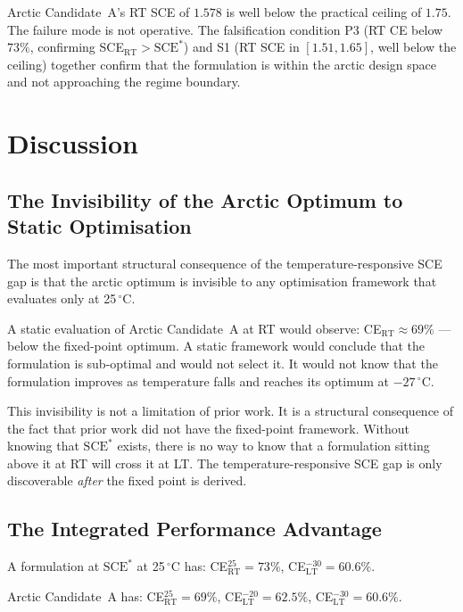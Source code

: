 \documentclass[11pt]{article}
\theoremstyle{plain}
\theoremstyle{definition}
\theoremstyle{remark}
\begin{document}
Arctic Candidate~A's RT SCE of $1.578$ is well below the practical
ceiling of $1.75$.  The failure mode is not operative.  The
falsification condition P3 (RT CE below $73\%$, confirming
SCE$_\mathrm{RT} > \mathrm{SCE}^{*}$) and S1 (RT SCE in
$[1.51, 1.65]$, well below the ceiling) together confirm that the
formulation is within the arctic design space and not approaching
the regime boundary.

\section{Discussion}

\subsection{The Invisibility of the Arctic Optimum to Static Optimisation}

The most important structural consequence of the temperature-responsive
SCE gap is that the arctic optimum is invisible to any optimisation
framework that evaluates only at 25\,$^\circ$C.

A static evaluation of Arctic Candidate~A at RT would observe:
CE$_\mathrm{RT} \approx 69\%$ --- below the fixed-point optimum.
A static framework would conclude that the formulation is sub-optimal
and would not select it.  It would not know that the formulation
improves as temperature falls and reaches its optimum at
$-27\,^\circ$C.

This invisibility is not a limitation of prior work.  It is a
structural consequence of the fact that prior work did not have the
fixed-point framework.  Without knowing that $\mathrm{SCE}^{*}$
exists, there is no way to know that a formulation sitting above it
at RT will cross it at LT.  The temperature-responsive SCE gap is
only discoverable \emph{after} the fixed point is derived.

\subsection{The Integrated Performance Advantage}

A formulation at $\mathrm{SCE}^{*}$ at 25\,$^\circ$C has:
CE$_\mathrm{RT}^{25} = 73\%$, CE$_\mathrm{LT}^{-30} = 60.6\%$.

Arctic Candidate~A has:
CE$_\mathrm{RT}^{25} = 69\%$,
CE$_\mathrm{LT}^{-20} = 62.5\%$,
CE$_\mathrm{LT}^{-30} = 60.6\%$.
\end{document}

